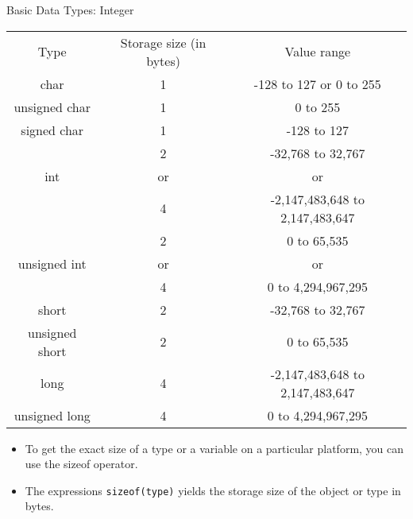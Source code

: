 \documentclass[10pt,t]{beamer}
\begin{document}
\begin{frame}[fragile]{Basic Data Types: Integer}
  \begin{center}
    \begin{tabular}{ccc}
      \rowcolor{lublue}Type & Storage size (in bytes) & Value range \\
      \rowcolor{lulime}char            & 1      & -128 to 127 or 0 to 255 \\
      \rowcolor{lulime}unsigned char   & 1      & 0 to 255 \\
      \rowcolor{lulime}signed char     & 1      & -128 to 127 \\
      \rowcolor{lulime!60}\multirow{3}{*}{int} & 2 & -32,768 to 32,767 \\ \rowcolor{lulime!60}int & or & or \\ \rowcolor{lulime!60}& 4 &  -2,147,483,648 to 2,147,483,647 \\
      \rowcolor{lulime}\multirow{3}{*}{unsigned int} & 2 & 0 to 65,535 \\ \rowcolor{lulime}unsigned int& or & or  \\ \rowcolor{lulime}& 4 & 0 to 4,294,967,295 \\
      \rowcolor{lulime!60}short           & 2      & -32,768 to 32,767 \\
      \rowcolor{lulime!60}unsigned short  & 2      & 0 to 65,535 \\ 
      \rowcolor{lulime}long            & 4      & -2,147,483,648 to 2,147,483,647 \\
      \rowcolor{lulime}unsigned long   & 4      & 0 to 4,294,967,295 \\
    \end{tabular}
  \end{center}
  \begin{itemize}
    \item To get the exact size of a type or a variable on a particular platform, you can use the sizeof operator. 
    \item The expressions \lstinline[basicstyle=\scriptsize\ttfamily]|sizeof(type)| yields the storage size of the object or type in bytes. 
  \end{itemize}
\end{frame}
\end{document}
